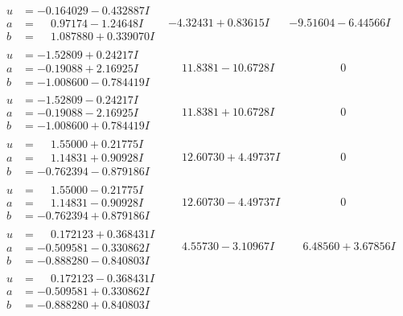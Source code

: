 \documentclass[1p]{elsarticle_modified}
\theoremstyle{definition}
\begin{document}
$$\begin{array}{c|c|c}
 \hline 
\begin{aligned}
u &= -0.164029 - 0.432887 I \\
a &= \phantom{-}0.97174 - 1.24648 I \\
b &= \phantom{-}1.087880 + 0.339070 I\end{aligned}
 & -4.32431 + 0.83615 I & -9.51604 - 6.44566 I \\ \hline\begin{aligned}
u &= -1.52809 + 0.24217 I \\
a &= -0.19088 + 2.16925 I \\
b &= -1.008600 - 0.784419 I\end{aligned}
 & \phantom{-}11.8381 - 10.6728 I & \phantom{-0.000000 } 0 \\ \hline\begin{aligned}
u &= -1.52809 - 0.24217 I \\
a &= -0.19088 - 2.16925 I \\
b &= -1.008600 + 0.784419 I\end{aligned}
 & \phantom{-}11.8381 + 10.6728 I & \phantom{-0.000000 } 0 \\ \hline\begin{aligned}
u &= \phantom{-}1.55000 + 0.21775 I \\
a &= \phantom{-}1.14831 + 0.90928 I \\
b &= -0.762394 - 0.879186 I\end{aligned}
 & \phantom{-}12.60730 + 4.49737 I & \phantom{-0.000000 } 0 \\ \hline\begin{aligned}
u &= \phantom{-}1.55000 - 0.21775 I \\
a &= \phantom{-}1.14831 - 0.90928 I \\
b &= -0.762394 + 0.879186 I\end{aligned}
 & \phantom{-}12.60730 - 4.49737 I & \phantom{-0.000000 } 0 \\ \hline\begin{aligned}
u &= \phantom{-}0.172123 + 0.368431 I \\
a &= -0.509581 - 0.330862 I \\
b &= -0.888280 - 0.840803 I\end{aligned}
 & \phantom{-}4.55730 - 3.10967 I & \phantom{-}6.48560 + 3.67856 I \\ \hline\begin{aligned}
u &= \phantom{-}0.172123 - 0.368431 I \\
a &= -0.509581 + 0.330862 I \\
b &= -0.888280 + 0.840803 I\end{aligned}

\end{array}$$
\end{document}
